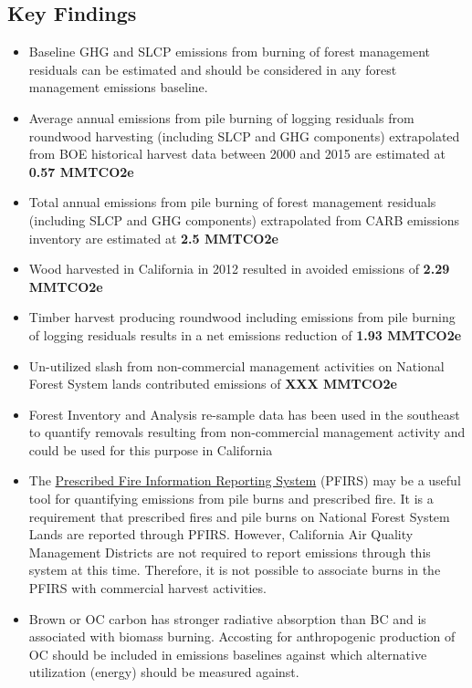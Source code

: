 \documentclass[a4paper]{article}
\begin{document}
\subsection{Key Findings}
\label{sec:orgheadline2}
\begin{itemize}
\item Baseline \ac{GHG} and \ac{SLCP} emissions from burning of forest
management residuals can be estimated and should be considered in
any forest management emissions baseline.

\item Average annual emissions from pile burning of logging residuals from roundwood harvesting
(including \ac{SLCP} and \ac{GHG} components) extrapolated from \ac{BOE} historical harvest data between 2000 and 2015 are estimated at \textbf{0.57 MMTCO2e}

\item Total annual emissions from pile burning of forest management residuals
(including \ac{SLCP} and \ac{GHG} components) extrapolated from CARB emissions
inventory are estimated at \textbf{2.5 MMTCO2e}

\item Wood harvested in California in 2012 resulted in avoided emissions of
\textbf{2.29 MMTCO2e}

\item Timber harvest producing roundwood including emissions from pile burning of logging residuals results in a net emissions reduction of \textbf{1.93 MMTCO2e}

\item Un-utilized slash from non-commercial management activities on National Forest System lands contributed emissions of \textbf{XXX MMTCO2e}

\item Forest Inventory and Analysis re-sample data has been used in the
southeast to quantify removals resulting from non-commercial
management activity and could be used for this purpose in California

\item The \href{https://ssl.arb.ca.gov/pfirs/}{Prescribed Fire Information Reporting System} (PFIRS) may be a useful tool for quantifying
emissions from pile burns and prescribed fire. It is a requirement that prescribed fires and pile
burns on National Forest System Lands are reported through PFIRS. However, California Air Quality Management
Districts are not required to report emissions through this system at this time. Therefore, it is not possible to associate burns in the PFIRS with commercial harvest activities.

\item Brown or \ac{OC} carbon has stronger radiative absorption than \ac{BC} and is associated with biomass burning. Accosting for anthropogenic production of \ac{OC} should be included in emissions baselines against which alternative utilization (energy) should be measured against.
\end{itemize}
\end{document}
